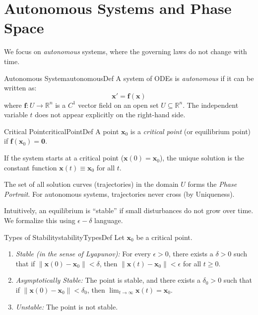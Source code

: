 \documentclass{book}
\newcommand{\R}{{\mathbb{R}}}
\newcommand{\sse}{\subseteq}
\begin{document}
\section{Autonomous Systems and Phase Space}

We focus on \emph{autonomous} systems, where the governing laws do not change with time.

\begin{defn}{Autonomous System}{autonomousDef}
    A system of ODEs is \emph{autonomous} if it can be written as:
    \[
        \mathbf{x}' = \mathbf{f}(\mathbf{x})
    \]
    where $\mathbf{f}: U \to \R^n$ is a $C^1$ vector field on an open set $U \sse \R^n$. The independent variable $t$ does not appear explicitly on the right-hand side.
\end{defn}

\begin{defn}{Critical Point}{criticalPointDef}
    A point $\mathbf{x}_0$ is a \emph{critical point} (or equilibrium point) if $\mathbf{f}(\mathbf{x}_0) = \mathbf{0}$.

    If the system starts at a critical point ($\mathbf{x}(0) = \mathbf{x}_0$), the unique solution is the constant function $\mathbf{x}(t) \equiv \mathbf{x}_0$ for all $t$.
\end{defn}

The set of all solution curves (trajectories) in the domain $U$ forms the \emph{Phase Portrait}. For autonomous systems, trajectories never cross (by Uniqueness).

Intuitively, an equilibrium is ``stable'' if small disturbances do not grow over time. We formalize this using $\epsilon-\delta$ language.

\begin{defn}{Types of Stability}{stabilityTypesDef}
    Let $\mathbf{x}_0$ be a critical point.
    \begin{enumerate}
        \item \emph{Stable (in the sense of Lyapunov):} For every $\epsilon > 0$, there exists a $\delta > 0$ such that if $\|\mathbf{x}(0) - \mathbf{x}_0\| < \delta$, then $\|\mathbf{x}(t) - \mathbf{x}_0\| < \epsilon$ for all $t \ge 0$.
        \item \emph{Asymptotically Stable:} The point is stable, and there exists a $\delta_0 > 0$ such that if $\|\mathbf{x}(0) - \mathbf{x}_0\| < \delta_0$, then $\lim_{t \to \infty} \mathbf{x}(t) = \mathbf{x}_0$.
        \item \emph{Unstable:} The point is not stable.
    \end{enumerate}
\end{defn}
\end{document}
